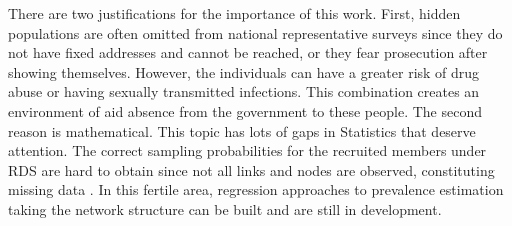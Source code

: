 There are two justifications for the importance of this work. First, hidden
populations are often omitted from national representative surveys since they
do not have fixed addresses and cannot be reached, or they fear prosecution
after showing themselves. However, the individuals can
have a greater risk of drug abuse or having sexually transmitted infections.
This combination creates an environment of aid absence from the government to
these people. The second reason is mathematical. This topic has lots of gaps
in Statistics that deserve attention. The correct sampling probabilities for
the recruited members under RDS are hard to obtain since not all links and
nodes are observed, constituting missing data \cite{crawford2016}. In this fertile area,
regression approaches to prevalence estimation taking the network structure
can be built \cite{bastos2012binary} and are still in development.